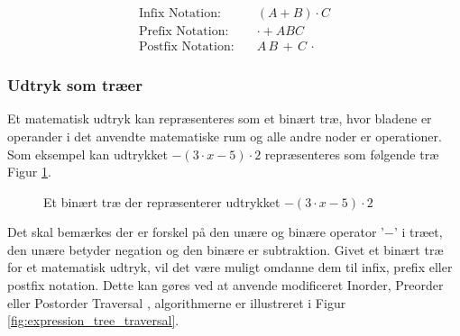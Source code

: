 \documentclass{article}
\begin{document}
\begin{align*}
    \text{Infix Notation:} \quad & (A + B) \cdot C \\
    \text{Prefix Notation:} \quad &  \cdot + A B C  \\
    \text{Postfix Notation:} \quad & A \, B \, + \, C \, \cdot
\end{align*}

 

\subsubsection{Udtryk som træer} \label{sec:expression_as_trees}
Et matematisk udtryk kan repræsenteres som et binært træ, hvor bladene er operander i det anvendte matematiske rum og alle andre noder er operationer. Som eksempel kan udtrykket $-(3 \cdot x - 5) \cdot 2$ repræsenteres som følgende træ Figur \ref{fig:expression_tree}. 


\begin{figure}[H]
\centering
{}
\caption{Et binært træ der repræsenterer udtrykket $-(3 \cdot x - 5) \cdot 2$}
\label{fig:expression_tree}
\end{figure}
Det skal bemærkes der er forskel på den unære og binære operator '$-$' i træet, den unære betyder negation og den binære er subtraktion. Givet et binært træ for et matematisk udtryk, vil det være muligt omdanne dem til infix, prefix eller postfix notation. Dette kan gøres ved at anvende modificeret Inorder, Preorder eller Postorder Traversal , algorithmerne er illustreret i Figur \ref{fig:expression_tree_traversal}.
\end{document}
